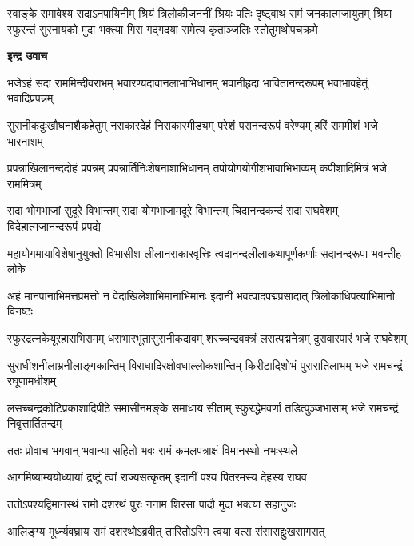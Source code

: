 \fourlineindentedshloka
{स्वाङ्के समावेश्य सदाऽनपायिनीम्}
{श्रियं त्रिलोकीजननीं श्रियः पतिः}
{दृष्ट्वाथ रामं जनकात्मजायुतम्}
{श्रिया स्फुरन्तं सुरनायको मुदा}
{भक्त्या गिरा गद्गदया समेत्य}
{कृताञ्जलिः स्तोतुमथोपचक्रमे} %

\textbf{इन्द्र उवाच}

\fourlineindentedshloka
{भजेऽहं सदा राममिन्दीवराभम्}
{भवारण्यदावानलाभाभिधानम्}
{भवानीहृदा भावितानन्दरूपम्}
{भवाभावहेतुं भवादिप्रपन्नम्} %

\fourlineindentedshloka
{सुरानीकदुःखौघनाशैकहेतुम्}
{नराकारदेहं निराकारमीड्यम्}
{परेशं परानन्दरूपं वरेण्यम्}
{हरिं राममीशं भजे भारनाशम्} %

\fourlineindentedshloka
{प्रपन्नाखिलानन्ददोहं प्रपन्नम्}
{प्रपन्नार्तिनिःशेषनाशाभिधानम्}
{तपोयोगयोगीशभावाभिभाव्यम्}
{कपीशादिमित्रं भजे राममित्रम्} %

\fourlineindentedshloka
{सदा भोगभाजां सुदूरे विभान्तम्}
{सदा योगभाजामदूरे विभान्तम्}
{चिदानन्दकन्दं सदा राघवेशम्}
{विदेहात्मजानन्दरूपं प्रपद्ये} %

\fourlineindentedshloka
{महायोगमायाविशेषानुयुक्तो}
{विभासीश लीलानराकारवृत्तिः}
{त्वदानन्दलीलाकथापूर्णकर्णाः}
{सदानन्दरूपा भवन्तीह लोके} %

\fourlineindentedshloka
{अहं मानपानाभिमत्तप्रमत्तो}
{न वेदाखिलेशाभिमानाभिमानः}
{इदानीं भवत्पादपद्मप्रसादात्}
{त्रिलोकाधिपत्याभिमानो विनष्टः} %

\fourlineindentedshloka
{स्फुरद्रत्नकेयूरहाराभिरामम्}
{धराभारभूतासुरानीकदावम्}
{शरच्चन्द्रवक्त्रं लसत्पद्मनेत्रम्}
{दुरावारपारं भजे राघवेशम्} %

\fourlineindentedshloka
{सुराधीशनीलाभ्रनीलाङ्गकान्तिम्}
{विराधादिरक्षोवधाल्लोकशान्तिम्}
{किरीटादिशोभं पुरारातिलाभम्}
{भजे रामचन्द्रं रघूणामधीशम्} %

\fourlineindentedshloka
{लसच्चन्द्रकोटिप्रकाशादिपीठे}
{समासीनमङ्के समाधाय सीताम्}
{स्फुरद्धेमवर्णां तडित्पुञ्जभासाम्}
{भजे रामचन्द्रं निवृत्तार्तितन्द्रम्} %

\twolineshloka
{ततः प्रोवाच भगवान् भवान्या सहितो भवः}
{रामं कमलपत्राक्षं विमानस्थो नभःस्थले} %

\twolineshloka
{आगमिष्याम्ययोध्यायां द्रष्टुं त्वां राज्यसत्कृतम्}
{इदानीं पश्य पितरमस्य देहस्य राघव} %

\twolineshloka
{ततोऽपश्यद्विमानस्थं रामो दशरथं पुरः}
{ननाम शिरसा पादौ मुदा भक्त्या सहानुजः} %

\twolineshloka
{आलिङ्ग्य मूर्ध्न्यवघ्राय रामं दशरथोऽब्रवीत्}
{तारितोऽस्मि त्वया वत्स संसाराद्दुःखसागरात्} %

